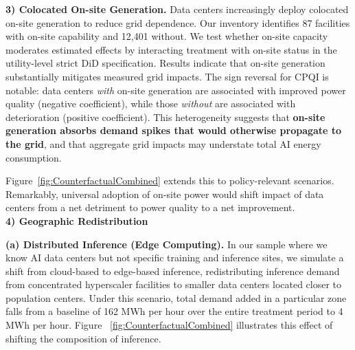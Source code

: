 \documentclass[a4paper,fleqn,longmktitle]{cas-sc}
\newcommand{\nb}[1]{\textcolor{blue}{NB[#1]}}
\begin{document}
\noindent\textbf{3) Colocated On-site Generation.} Data centers increasingly deploy colocated on-site generation to reduce grid dependence. Our inventory identifies 87 facilities with on-site capability and 12,401 without. We test whether on-site capacity moderates estimated effects by interacting treatment with on-site status in the utility-level strict DiD specification. Results indicate that on-site generation substantially mitigates measured grid impacts. The sign reversal for CPQI is notable: data centers \textit{with} on-site generation are associated with improved power quality (negative coefficient), while those \textit{without} are associated with deterioration (positive coefficient). This heterogeneity suggests that \textbf{on-site generation absorbs demand spikes that would otherwise propagate to the grid}, and that aggregate grid impacts may understate total AI energy consumption.

Figure~\ref{fig:CounterfactualCombined} extends this to policy-relevant scenarios. Remarkably, universal adoption of on-site power would shift impact of data centers from a net detriment to power quality to a net improvement.\\


\noindent\textbf{4) Geographic Redistribution}


\noindent\textbf{(a) Distributed Inference (Edge Computing).} In our sample where we know AI data centers but not specific training and inference sites, we simulate a shift from cloud-based to edge-based inference, redistributing inference demand from concentrated hyperscaler facilities to smaller data centers located closer to population centers. Under this scenario, total demand added in a particular zone falls from a baseline of 162 MWh per hour over the entire treatment period to 4 MWh per hour. Figure ~\ref{fig:CounterfactualCombined} illustrates this effect of shifting the composition of inference.
\end{document}
